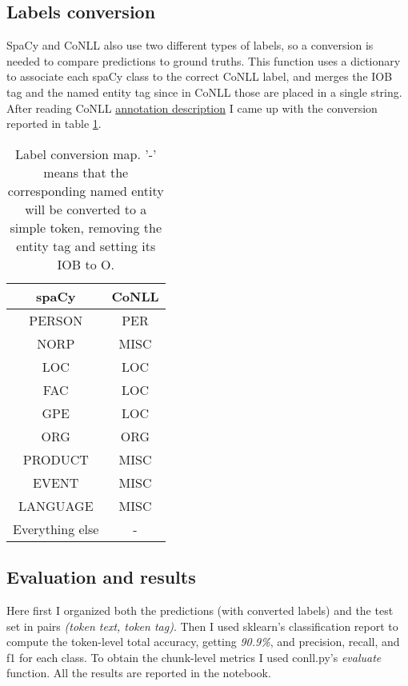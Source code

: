 \documentclass[twocolumn, a4paper]{article}
\begin{document}
\subsection{Labels conversion}
SpaCy and CoNLL also use two different types of labels, so a conversion is needed to compare predictions to ground truths. This function uses a dictionary to associate each spaCy class to the correct CoNLL label, and merges the IOB tag and the named entity tag since in CoNLL those are placed in a single string. After reading CoNLL \href{https://www.clips.uantwerpen.be/conll2003/ner/annotation.txt}{annotation description} I came up with the conversion reported in table \ref{tab:label_conv}.

\begin{table}[h]
    \centering
    \begin{tabular}{|c|c|}
        \hline
        \textbf{spaCy} & \textbf{CoNLL}\\
        \hline
        PERSON & PER\\
        \hline
        NORP & MISC\\
        \hline
        LOC & LOC\\
        \hline
        FAC & LOC\\
        \hline
        GPE & LOC\\
        \hline
        ORG & ORG\\
        \hline
        PRODUCT & MISC\\
        \hline
        EVENT & MISC\\
        \hline
        LANGUAGE & MISC\\
        \hline
        Everything else & - \\
        \hline
    \end{tabular}
    \caption{Label conversion map. '-' means that the corresponding named entity will be converted to a simple token, removing the entity tag and setting its IOB to O.}
    \label{tab:label_conv}
\end{table}

\subsection{Evaluation and results}
\label{sec:spacy-eval}
Here first I organized both the predictions (with converted labels) and the test set in pairs \textit{(token text, token tag)}. Then I used sklearn's classification report to compute the token-level total accuracy, getting \textit{90.9\%}, and precision, recall, and f1 for each class. To obtain the chunk-level metrics I used conll.py's \textit{evaluate} function. All the results are reported in the notebook.
\end{document}
